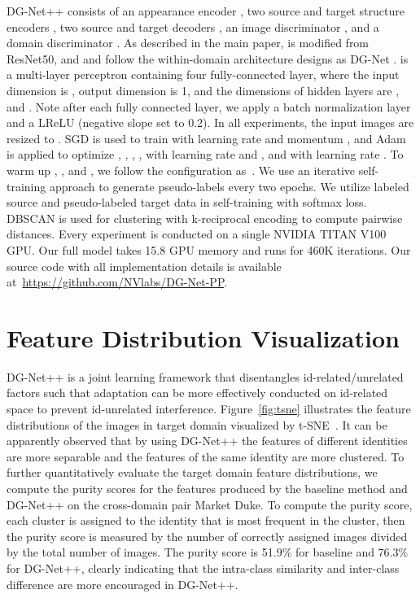 \documentclass[runningheads]{llncs}
\begin{document}
DG-Net++ consists of an appearance encoder , two source and target structure encoders , two source and target decoders , an image discriminator , and a domain discriminator . As described in the main paper,  is modified from ResNet50, and  and  follow the within-domain architecture designs as DG-Net \cite{zheng2019joint}.  is a multi-layer perceptron containing four fully-connected layer, where the input dimension is , output dimension is 1, and the dimensions of hidden layers are ,  and . Note after each fully connected layer, we apply a batch normalization layer \cite{ioffe2015batch} and a LReLU \cite{xu2015empirical} (negative slope set to 0.2). In all experiments, the input images are resized to . SGD is used to train  with learning rate  and momentum , and Adam is applied to optimize , , , ,  with learning rate  and , and  with learning rate . To warm up , ,  and , we follow the configuration as~\cite{zheng2019joint}. 
We use an iterative self-training approach to generate pseudo-labels every two epochs. We utilize labeled source and pseudo-labeled target data in self-training with softmax loss. DBSCAN is used for clustering with k-reciprocal encoding to compute pairwise distances. 
Every experiment is conducted on a single NVIDIA TITAN V100 GPU. Our full model takes 15.8 GPU memory and runs for 460K iterations. Our source code with all implementation details is available at~\url{https://github.com/NVlabs/DG-Net-PP}. 

\section{Feature Distribution Visualization}

DG-Net++ is a joint learning framework that disentangles id-related/unrelated factors such that adaptation can be more effectively conducted on id-related space to prevent id-unrelated interference. Figure~\ref{fig:tsne} illustrates the feature distributions of the images in target domain visualized by t-SNE~\cite{tsne}. It can be apparently observed that by using DG-Net++ the features of different identities are more separable and the features of the same identity are more clustered.          
To further quantitatively evaluate the target domain feature distributions, we compute the purity scores for the features produced by the baseline method and DG-Net++ on the cross-domain pair Market  Duke. 
To compute the purity score, each cluster is assigned to the identity that is most frequent in the cluster, then the purity score is measured by the number of correctly assigned images divided by the total number of images. The purity score is 51.9\% for baseline and 76.3\% for DG-Net++, clearly indicating that the intra-class similarity and inter-class difference are more encouraged in DG-Net++.
\end{document}
